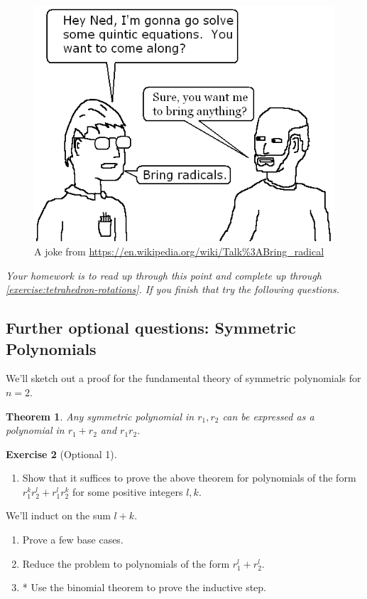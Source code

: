 \documentclass[reqno, 12pt, letter]{article}
\theoremstyle{plain}
\newtheorem{theorem}{Theorem}[section]
\theoremstyle{definition}
\newtheorem{exercise}[theorem]{Exercise}
\theoremstyle{remark}
\numberwithin{equation}{section}
\begin{document}
\begin{figure}
		\includegraphics[scale=.7]{bring-radical.png}
\caption{A joke from \url{https://en.wikipedia.org/wiki/Talk\%3ABring_radical}}
		\label{figure:bring-radicals}
\end{figure}


{\it Your homework is to read up through this point and complete up through \autoref{exercise:tetrahedron-rotations}. If you finish that try the following questions.}

\subsection{Further optional questions: Symmetric Polynomials}
We'll sketch out a proof for the fundamental theory of symmetric polynomials for $ n=2$.
\begin{theorem}
	\label{theorem:fundamental_theorem_symmetric_polynomials}
	Any symmetric polynomial in $ r_1, r_2$ can be expressed as a polynomial in $ r_1 + r_2$ and $r_1 r_2$.
\end{theorem}
\begin{exercise}[Optional 1]
	\begin{enumerate}
		\item Show that it suffices to prove the above theorem for polynomials of the form $ r_1^k r_2^l + r_1^l r_2^k$ for some positive integers $l,k$.
	\end{enumerate}
	We'll induct on the sum $ l+k$.
	\begin{enumerate}[resume]
		\item Prove a few base cases.
		\item Reduce the problem to polynomials of the form $ r_1^l + r_2^l$.
		\item* Use the binomial theorem to prove the inductive step.
	\end{enumerate}
\end{exercise}
\end{document}
